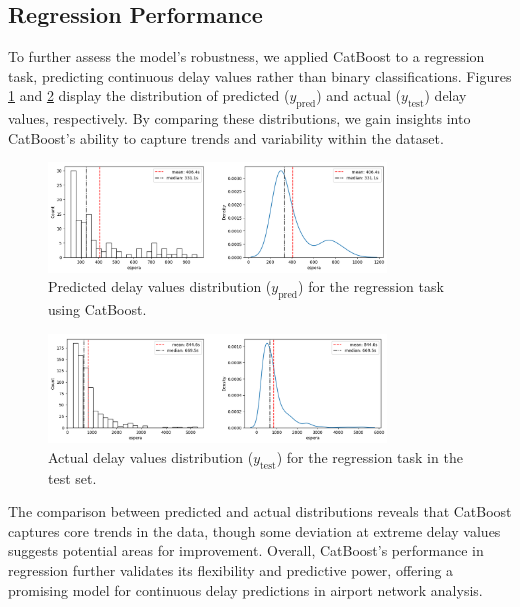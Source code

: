 \subsection{Regression Performance}

To further assess the model's robustness, we applied CatBoost to a
regression task, predicting continuous delay values rather than binary
classifications. Figures \ref{fig:y_pred} and \ref{fig:y_test} display
the distribution of predicted ($y_\text{pred}$) and actual
($y_\text{test}$) delay values, respectively. By comparing these
distributions, we gain insights into CatBoost’s ability to capture
trends and variability within the dataset.

\begin{figure}[!htbp]
    \centering
    \includegraphics[width=0.8\textwidth]{img/regression_catboost_ypred.png}
    \caption{Predicted delay values distribution ($y_\text{pred}$) for
    the regression task using CatBoost.}
    \label{fig:y_pred}
\end{figure}

\begin{figure}[!htbp]
    \centering
    \includegraphics[width=0.8\textwidth]{img/regression_catboost_ytest.png}
    \caption{Actual delay values distribution ($y_\text{test}$) for
    the regression task in the test set.}
    \label{fig:y_test}
\end{figure}

The comparison between predicted and actual distributions reveals that
CatBoost captures core trends in the data, though some deviation at
extreme delay values suggests potential areas for
improvement. Overall, CatBoost’s performance in regression further
validates its flexibility and predictive power, offering a promising
model for continuous delay predictions in airport network analysis.

